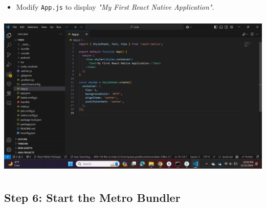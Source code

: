 \documentclass{article}
\begin{document}
\begin{itemize} 
    \item Modify \texttt{App.js} to display \textit{"My First React Native Application"}.
\end{itemize}
\includegraphics[width=5.57813in,height=3.13391in]{media/image29.png}

\subsection*{Step 6: Start the Metro Bundler}
\end{document}
